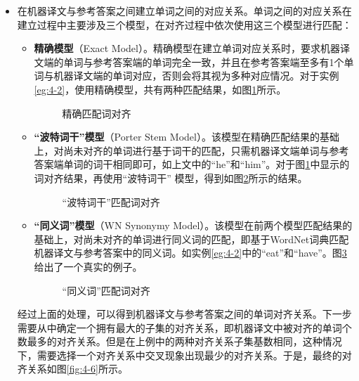 \begin{itemize}
\vspace{0.5em}
\item 在机器译文与参考答案之间建立单词之间的对应关系。单词之间的对应关系在建立过程中主要涉及三个模型，在对齐过程中依次使用这三个模型进行匹配：
    \begin{itemize}
    \item {\small\sffamily\bfseries{精确模型}}（Exact Model）。精确模型在建立单词对应关系时，要求机器译文端的单词与参考答案端的单词完全一致，并且在参考答案端至多有1个单词与机器译文端的单词对应，否则会将其视为多种对应情况。对于实例\ref{eg:4-2}，使用精确模型，共有两种匹配结果，如图\ref{fig:4-3}所示。

\begin{figure}[htp]
    \centering
   \caption{精确匹配词对齐}
   \label{fig:4-3}
\end{figure}
    \item  {\small\sffamily\bfseries{“波特词干”模型}}（Porter Stem Model）。该模型在精确匹配结果的基础上，对尚未对齐的单词进行基于词干的匹配，只需机器译文端单词与参考答案端单词的词干相同即可，如上文中的“he”和“him”。对于图\ref{fig:4-3}中显示的词对齐结果，再使用“波特词干” 模型，得到如图\ref{fig:4-4}所示的结果。

\begin{figure}[htp]
    \centering
	
    \caption{“波特词干”匹配词对齐}
    \label{fig:4-4}
\end{figure}
    \item {\small\sffamily\bfseries{“同义词”模型}}（WN Synonymy Model）。该模型在前两个模型匹配结果的基础上，对尚未对齐的单词进行同义词的匹配，即基于WordNet词典匹配机器译文与参考答案中的同义词。如实例\ref{eg:4-2}中的“eat”和“have”。图\ref{fig:4-5}给出了一个真实的例子。

\begin{figure}[htp]
    \centering
    
    \caption{“同义词”匹配词对齐}
    \label{fig:4-5}
\end{figure}
    \end{itemize}
经过上面的处理，可以得到机器译文与参考答案之间的单词对齐关系。下一步需要从中确定一个拥有最大的子集的对齐关系，即机器译文中被对齐的单词个数最多的对齐关系。但是在上例中的两种对齐关系子集基数相同，这种情况下，需要选择一个对齐关系中交叉现象出现最少的对齐关系。于是，最终的对齐关系如图\ref{fig:4-6}所示。


\end{itemize}
